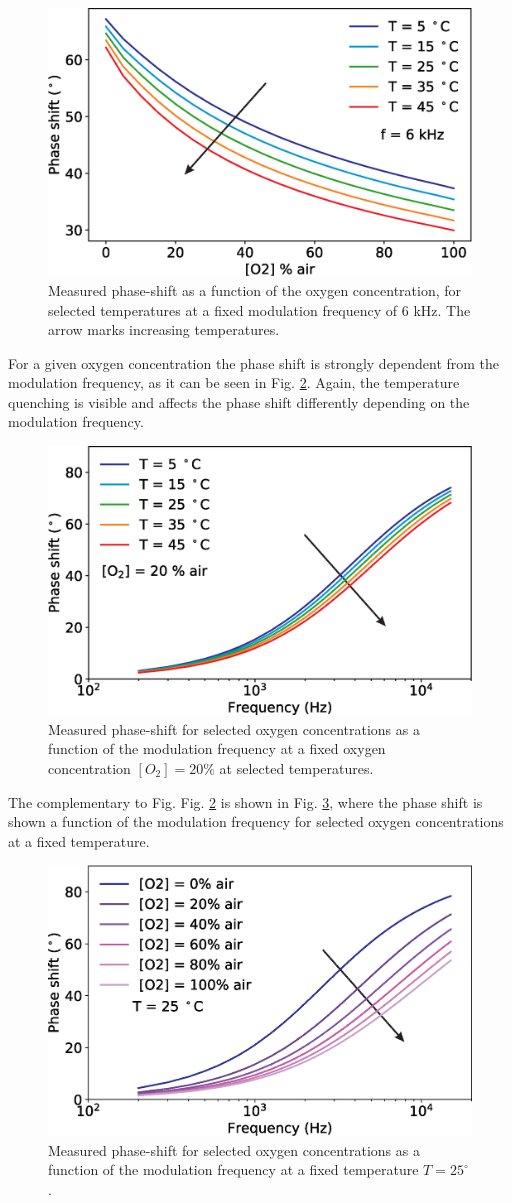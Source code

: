 \documentclass[9pt,twocolumn,twoside,pdftex]{optica}
\begin{document}
\begin{figure}[htbp]
\centering
\includegraphics[width=8 cm]{phase_O2_T.eps}
\caption{Measured phase-shift as a function of the oxygen concentration, for selected temperatures at a fixed modulation frequency of 6 kHz. The arrow marks increasing temperatures.}
\label{fig:expdata1}
\end{figure}

For a given oxygen concentration the phase shift is strongly dependent from the modulation frequency, as it can be seen in Fig. \ref{fig:expdata2}. Again, the temperature quenching is visible and affects the phase shift differently depending on the modulation frequency.

\begin{figure}[htbp]
\centering
\includegraphics[width=8 cm]{phase_f_T.eps}
\caption{Measured phase-shift for selected oxygen concentrations as a function of the modulation frequency at a fixed oxygen concentration $[O_2]=20 \%$ at selected temperatures.}
\label{fig:expdata2}
\end{figure}

The complementary to Fig. Fig. \ref{fig:expdata2} is shown in Fig. \ref{fig:expdata3}, where the phase shift is shown a function of the modulation frequency for selected oxygen concentrations at a fixed temperature.

\begin{figure}[htbp]
\centering
\includegraphics[width=8 cm]{phase_f_O2.eps}
\caption{Measured phase-shift for selected oxygen concentrations as a function of the modulation frequency at a fixed temperature $T=25 ^{\circ}$ .}
\label{fig:expdata3}
\end{figure}
\end{document}
